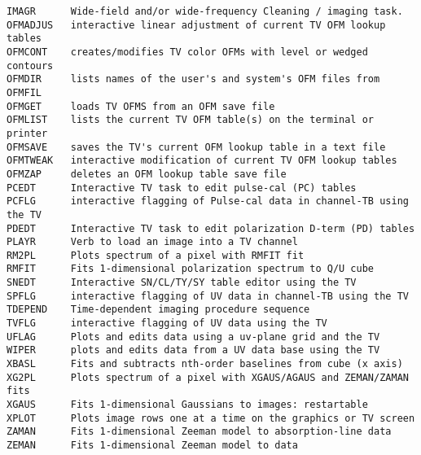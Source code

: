 \begin{verbatim}
IMAGR      Wide-field and/or wide-frequency Cleaning / imaging task.
OFMADJUS   interactive linear adjustment of current TV OFM lookup tables
OFMCONT    creates/modifies TV color OFMs with level or wedged contours
OFMDIR     lists names of the user's and system's OFM files from OFMFIL
OFMGET     loads TV OFMS from an OFM save file
OFMLIST    lists the current TV OFM table(s) on the terminal or printer
OFMSAVE    saves the TV's current OFM lookup table in a text file
OFMTWEAK   interactive modification of current TV OFM lookup tables
OFMZAP     deletes an OFM lookup table save file
PCEDT      Interactive TV task to edit pulse-cal (PC) tables
PCFLG      interactive flagging of Pulse-cal data in channel-TB using the TV
PDEDT      Interactive TV task to edit polarization D-term (PD) tables
PLAYR      Verb to load an image into a TV channel
RM2PL      Plots spectrum of a pixel with RMFIT fit
RMFIT      Fits 1-dimensional polarization spectrum to Q/U cube
SNEDT      Interactive SN/CL/TY/SY table editor using the TV
SPFLG      interactive flagging of UV data in channel-TB using the TV
TDEPEND    Time-dependent imaging procedure sequence
TVFLG      interactive flagging of UV data using the TV
UFLAG      Plots and edits data using a uv-plane grid and the TV
WIPER      plots and edits data from a UV data base using the TV
XBASL      Fits and subtracts nth-order baselines from cube (x axis)
XG2PL      Plots spectrum of a pixel with XGAUS/AGAUS and ZEMAN/ZAMAN fits
XGAUS      Fits 1-dimensional Gaussians to images: restartable
XPLOT      Plots image rows one at a time on the graphics or TV screen
ZAMAN      Fits 1-dimensional Zeeman model to absorption-line data
ZEMAN      Fits 1-dimensional Zeeman model to data
\end{verbatim}\eve

\vfill\eject
{}

